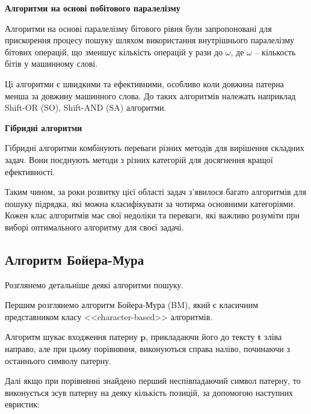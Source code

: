 \documentclass[a4paper,14pt]{extarticle} %
\begin{document}
\textbf{Алгоритми на основі побітового паралелізму}

Алгоритми на основі паралелізму бітового рівня були запропоновані для прискорення процесу пошуку шляхом використання внутрішнього паралелізму бітових операцій, що зменшує кількість операцій у рази до $\omega$, де $\omega$ –  кількость бітів у машинному слові.

Ці алгоритми є швидкими та ефективними, особливо коли довжина патерна менша за довжину машинного слова. До таких алгоритмів належать наприклад Shift-OR (SO), Shift-AND (SA) алгоритми.

\textbf{Гібридні алгоритми}

Гібридні алгоритми комбінують переваги різних методів для вирішення складних задач. Вони поєднують методи з різних категорій для досягнення кращої ефективності.

Таким чином, за роки розвитку цієї області задач з'явилося багато алгоритмів для пошуку підрядка, які можна класифікувати за чотирма основними категоріями. Кожен клас алгоритмів має свої недоліки та переваги, які важливо розуміти при виборі оптимального алгоритму для своєї задачі.

\subsection{Алгоритм Бойера-Мура}
Розглянемо детальніше деякі алгоритми пошуку.

Першим розглянемо алгоритм Бойера-Мура (BM), який є класичним представником класу <<character-based>> алгоритмів.

Алгоритм шукає входження патерну $\textbf{p}$, прикладаючи його до тексту $\textbf{t}$ зліва направо, але при цьому порівняння, виконуються справа наліво, починаючи з останнього символу патерну.

Далі якщо при порівнянні знайдено перший неспівпадаючий символ патерну, то виконується зсув патерну на деяку кількість позицій, за допомогою наступних евристик:
\end{document}
